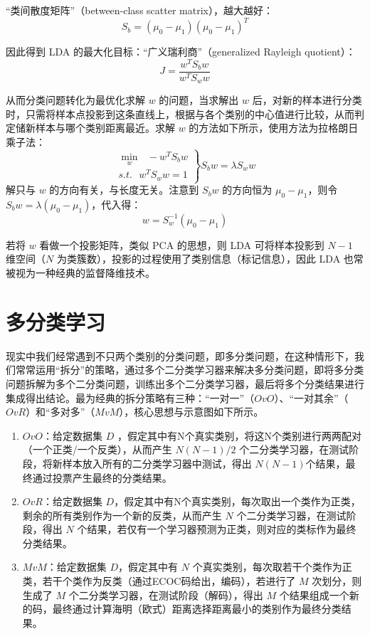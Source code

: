 \documentclass[12pt, a4paper]{article} %
\begin{document}
“类间散度矩阵”（between-class scatter matrix），越大越好：
\begin{equation*}
    S_b = (\mu_0 - \mu_1)(\mu_0 - \mu_1)^T
\end{equation*}

因此得到 LDA 的最大化目标：“广义瑞利商”（generalized Rayleigh quotient）：
\begin{equation*}
    J = \frac{w^T S_b w}{w^T S_w w}
\end{equation*}

从而分类问题转化为最优化求解 $w$ 的问题，当求解出 $w$ 后，对新的样本进行分类时，只需将样本点投影到这条直线上，根据与各个类别的中心值进行比较，从而判定储新样本与哪个类别距离最近。求解 $w$ 的方法如下所示，使用方法为拉格朗日乘子法：
\begin{equation*}
    \left. \begin{array}{l}
        \mathop {\min }\limits_w \ \ \  - {w^T}{S_b}w\\
        s.t. \ \ \ {w^T}{S_w}w = 1
    \end{array} \right\}{S_b}w = \lambda {S_w}w
\end{equation*}
解只与 $w$ 的方向有关，与长度无关。注意到 $S_b w$ 的方向恒为 $\mu_0 - \mu_1$，则令 $S_b w = \lambda (\mu_0 - \mu_1)$，代入得：
\begin{equation*}
    w = S_w^{-1} (\mu_0 - \mu_1)
\end{equation*}

若将 $w$ 看做一个投影矩阵，类似 PCA 的思想，则 LDA 可将样本投影到 $N-1$ 维空间（$N$ 为类簇数），投影的过程使用了类别信息（标记信息），因此 LDA 也常被视为一种经典的监督降维技术。

\section{多分类学习}

现实中我们经常遇到不只两个类别的分类问题，即多分类问题，在这种情形下，我们常常运用“拆分”的策略，通过多个二分类学习器来解决多分类问题，即将多分类问题拆解为多个二分类问题，训练出多个二分类学习器，最后将多个分类结果进行集成得出结论。最为经典的拆分策略有三种：“一对一”（$OvO$）、“一对其余”（$OvR$）和“多对多”（$MvM$），核心思想与示意图如下所示。

\begin{enumerate}[\hspace*{2em} i.]
    \item $OvO$：给定数据集 $D$ ，假定其中有N个真实类别，将这N个类别进行两两配对（一个正类/一个反类），从而产生 $N(N-1)/2$ 个二分类学习器，在测试阶段，将新样本放入所有的二分类学习器中测试，得出 $N(N-1)$个结果，最终通过投票产生最终的分类结果。
    \item $OvR$：给定数据集 $D$，假定其中有N个真实类别，每次取出一个类作为正类，剩余的所有类别作为一个新的反类，从而产生 $N$ 个二分类学习器，在测试阶段，得出 $N$ 个结果，若仅有一个学习器预测为正类，则对应的类标作为最终分类结果。
    \item $MvM$：给定数据集 $D$，假定其中有 $N$ 个真实类别，每次取若干个类作为正类，若干个类作为反类（通过ECOC码给出，编码），若进行了 $M$ 次划分，则生成了 $M$ 个二分类学习器，在测试阶段（解码），得出 $M$ 个结果组成一个新的码，最终通过计算海明（欧式）距离选择距离最小的类别作为最终分类结果。
\end{enumerate}
\end{document}
